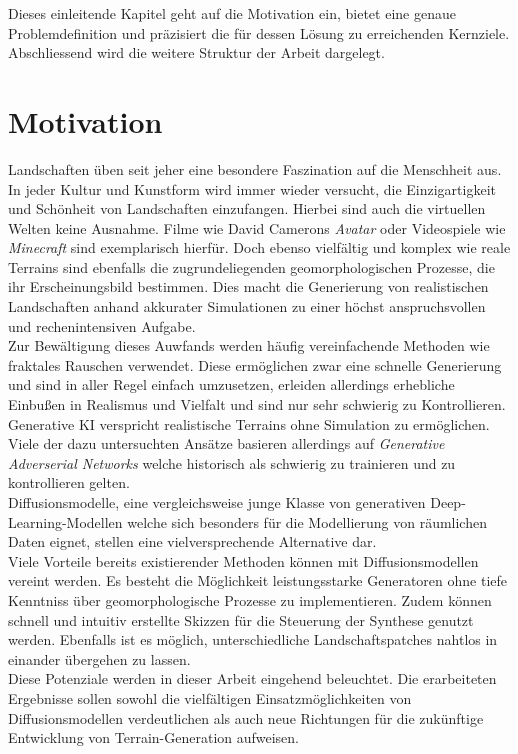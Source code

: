 Dieses einleitende Kapitel geht auf die Motivation ein, bietet eine genaue Problemdefinition und präzisiert die für dessen Lösung zu erreichenden Kernziele. Abschliessend wird die weitere Struktur der Arbeit dargelegt. 


\section{Motivation}

Landschaften üben seit jeher eine besondere Faszination auf die Menschheit aus. In jeder Kultur und Kunstform wird immer wieder versucht, die Einzigartigkeit und Schönheit von Landschaften einzufangen. Hierbei sind auch die virtuellen Welten keine Ausnahme. Filme wie David Camerons \textit{Avatar} oder Videospiele wie \textit{Minecraft} sind exemplarisch hierfür. Doch ebenso vielfältig und komplex wie reale Terrains sind ebenfalls die zugrundeliegenden geomorphologischen Prozesse, die ihr Erscheinungsbild bestimmen. Dies macht die Generierung von realistischen Landschaften anhand akkurater Simulationen zu einer höchst anspruchsvollen und rechenintensiven Aufgabe. \\
Zur Bewältigung dieses Auwfands werden häufig vereinfachende Methoden wie fraktales Rauschen verwendet. Diese ermöglichen zwar eine schnelle Generierung und sind in aller Regel einfach umzusetzen, erleiden allerdings erhebliche Einbußen in Realismus und Vielfalt und sind nur sehr schwierig zu Kontrollieren. \\
Generative \ac{KI} verspricht realistische Terrains ohne Simulation zu ermöglichen. Viele der dazu untersuchten Ansätze basieren allerdings auf \textit{Generative Adverserial Networks} welche historisch als schwierig zu trainieren und zu kontrollieren gelten. \\
Diffusionsmodelle, eine vergleichsweise junge Klasse von generativen Deep-Learning-Modellen welche sich besonders für die Modellierung von räumlichen Daten eignet, stellen eine vielversprechende Alternative dar. \\
Viele Vorteile bereits existierender Methoden können mit Diffusionsmodellen vereint werden. Es besteht die Möglichkeit leistungsstarke Generatoren ohne tiefe Kenntniss über geomorphologische Prozesse zu implementieren. Zudem können schnell und intuitiv erstellte Skizzen für die Steuerung der Synthese genutzt werden. Ebenfalls ist es möglich, unterschiedliche Landschaftspatches nahtlos in einander übergehen zu lassen. \\
Diese Potenziale werden in dieser Arbeit eingehend beleuchtet. Die erarbeiteten Ergebnisse sollen sowohl die vielfältigen Einsatzmöglichkeiten von Diffusionsmodellen verdeutlichen als auch neue Richtungen für die zukünftige Entwicklung von Terrain-Generation aufweisen.


